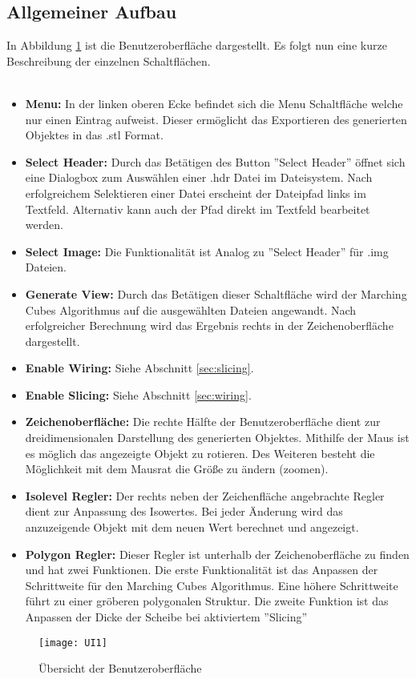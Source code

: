 \subsection{Allgemeiner Aufbau}
In Abbildung \ref{fig:UI1} ist die Benutzeroberfläche dargestellt. Es folgt nun eine kurze Beschreibung der einzelnen Schaltflächen.\\
\\
\begin{itemize}
	\item \textbf{Menu:} In der linken oberen Ecke befindet sich die Menu Schaltfläche welche nur einen Eintrag aufweist. Dieser ermöglicht das Exportieren des generierten Objektes in das .stl Format.
	\item \textbf{Select Header:} Durch das Betätigen des Button ''Select Header'' öffnet sich eine Dialogbox zum Auswählen einer .hdr Datei im Dateisystem. Nach erfolgreichem Selektieren einer Datei erscheint der Dateipfad links im Textfeld. Alternativ kann auch der Pfad direkt im Textfeld bearbeitet werden.
	\item \textbf{Select Image:} Die Funktionalität ist Analog zu ''Select Header'' für .img Dateien.
	\item \textbf{Generate View:} Durch das Betätigen dieser Schaltfläche wird der Marching Cubes Algorithmus auf die ausgewählten Dateien angewandt. Nach erfolgreicher Berechnung wird das Ergebnis rechts in der Zeichenoberfläche dargestellt.
	\item \textbf{Enable Wiring:} Siehe Abschnitt \ref{sec:slicing}.
	\item \textbf{Enable Slicing:} Siehe Abschnitt \ref{sec:wiring}.
	\item \textbf{Zeichenoberfläche:} Die rechte Hälfte der Benutzeroberfläche dient zur dreidimensionalen Darstellung des generierten Objektes. Mithilfe der Maus ist es möglich das angezeigte Objekt zu rotieren. Des Weiteren besteht die Möglichkeit mit dem Mausrat die Größe zu ändern (zoomen).
	\item \textbf{Isolevel Regler:} Der rechts neben der Zeichenfläche angebrachte Regler dient zur Anpassung des Isowertes. Bei jeder Änderung wird das anzuzeigende Objekt mit dem neuen Wert berechnet und angezeigt.
	\item \textbf{Polygon Regler:} Dieser Regler ist unterhalb der Zeichenoberfläche zu finden und hat zwei Funktionen. Die erste Funktionalität ist das Anpassen der Schrittweite für den Marching Cubes Algorithmus. Eine höhere Schrittweite führt zu einer gröberen polygonalen Struktur. Die zweite Funktion ist das Anpassen der Dicke der Scheibe bei aktiviertem ''Slicing''
\end{itemize}
\begin{figure}[H]
	\centering
	\texttt{[image: UI1]}
	\caption{Übersicht der Benutzeroberfläche}
	\label{fig:UI1}
\end{figure}
